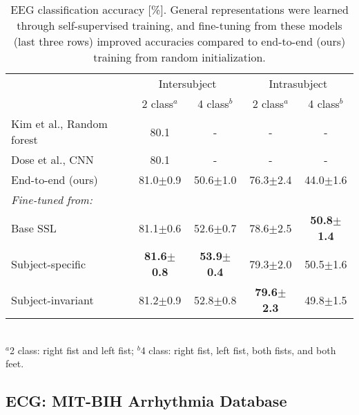 \documentclass{article}
\newcommand{\std}[1]{{\scriptsize{$\pm$#1}}}
\begin{document}
\begin{table}
  \centering
  \caption{EEG classification accuracy [\%]. General representations were
  learned through self-supervised training, and fine-tuning from these models
  (last three rows) improved accuracies compared to end-to-end (ours) training
  from random initialization.}
    \label{table:eeg:finetune}
  \small
  \begin{tabular}{lcccc}
    \toprule
    & \multicolumn{2}{c}{Intersubject} & \multicolumn{2}{c}{Intrasubject} \\
    \cmidrule(lr){2-3}\cmidrule(lr){4-5}
    & 2 class$^a$ & 4 class$^b$ & 2 class$^a$ & 4 class$^b$ \\
    \hline
    Kim et al., Random forest \cite{kim_motor_2016} & 80.1 & - & - & - \\
    Dose et al., CNN \cite{dose_deep_2018} & 80.1 & - & - & - \\


    End-to-end (ours)
& 81.0\std{0.9} & 50.6\std{1.0}
& 76.3\std{2.4} & 44.0\std{1.6}\\
    \hline
    \textit{Fine-tuned from:}\\

    \hspace{10pt}Base SSL
& 81.1\std{0.6} & 52.6\std{0.7}
& 78.6\std{2.5} & \textbf{50.8\std{1.4}} \\

    \hspace{10pt}Subject-specific
& \textbf{81.6\std{0.8}} & \textbf{53.9\std{0.4}}
& 79.3\std{2.0} & 50.5\std{1.6}\\

    \hspace{10pt}Subject-invariant
& 81.2\std{0.9} & 52.8\std{0.8}
& \textbf{79.6\std{2.3}} & 49.8\std{1.5} \\
    \bottomrule
  \end{tabular}\\
  \footnotesize{$^a$2 class: right fist and left fist; $^b$4 class: right fist,
  left fist, both fists, and both feet.}
\end{table}


  \subsection{ECG: MIT-BIH Arrhythmia Database}
\end{document}
